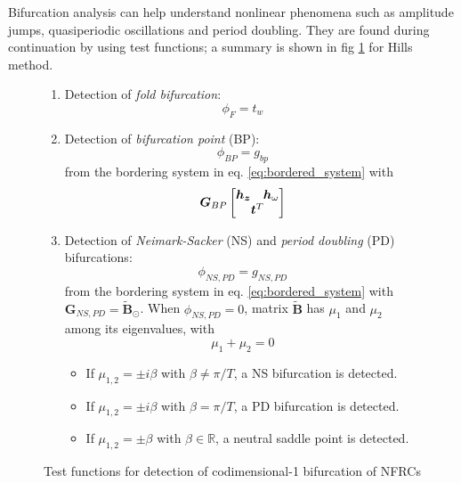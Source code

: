 Bifurcation analysis can help understand nonlinear phenomena such as amplitude
jumps, quasiperiodic oscillations and period doubling. They are found during
continuation by using test functions; a summary is shown in fig
\ref{fig:bif_scheme} for Hills method.

\begin{figure}[ht!]
  \centering
 \begin{mdframed}
    \begin{enumerate}
    \item Detection of \textit{fold bifurcation}:\\
      \begin{equation*}
        \phi_F = t_{w}
      \end{equation*}
    \item Detection of \textit{bifurcation point} (BP):\\
      \begin{equation*}
        \phi_{BP} = g_{bp}
      \end{equation*}
      from the bordering system in eq. \ref{eq:bordered_system} with
      \begin{equation*}
        \bm G_{BP}
        \begin{bmatrix}
          \bm h_{\bm z} & \bm h_{\omega} \\
          \multicolumn{2}{c}{\bm t^T}
        \end{bmatrix}
      \end{equation*}
    \item Detection of \textit{Neimark-Sacker} (NS) and \textit{period doubling}
      (PD) bifurcations:\\
      \begin{equation*}
        \phi_{NS,PD} = g_{NS,PD}
      \end{equation*}
      from the bordering system in eq. \ref{eq:bordered_system} with $\bm
      G_{NS,PD} = \tilde{\bm B}_\odot$. When $\phi_{NS,PD} = 0$, matrix
      $\tilde{\bm B}$ has $\mu_1$ and $\mu_2$ among its eigenvalues, with
      \begin{equation*}
        \mu_1 + \mu_2 = 0
      \end{equation*}
      \begin{itemize}
      \item If $\mu_{1,2}=\pm i\beta$ with $\beta \neq \pi/T$, a NS
        bifurcation is detected.
      \item If $\mu_{1,2}=\pm i\beta$ with $\beta = \pi/T$, a PD bifurcation is
        detected.
       \item If $\mu_{1,2}=\pm \beta$ with $\beta \in \mathbb{R}$, a neutral
         saddle point is detected.
      \end{itemize}
    \end{enumerate}
    \end{mdframed}
    \caption{Test functions for detection of codimensional-1 bifurcation of NFRCs}
    \label{fig:bif_scheme}
\end{figure}

